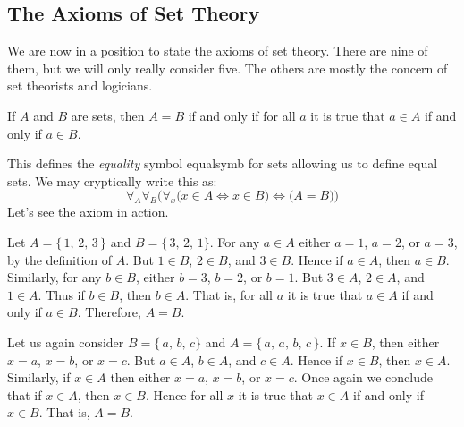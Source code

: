         \subsection{The Axioms of Set Theory}
            We are now in a position to state the axioms of set theory. There
            are nine of them, but we will only really consider five. The
            others are mostly the concern of set theorists and logicians.
            \begin{axiom}
                If $A$ and $B$ are sets, then $A=B$ if and only if for all
                $a$ it is true that $a\in{A}$ if and only if $a\in{B}$.%
            \end{axiom}
            This defines the \textit{equality} symbol \gls{equalsymb} for sets
            allowing us to define \glspl{equal set}.
            We may cryptically write this as:
            \begin{equation}
                \forall_{A}\forall_{B}\Big(
                    \forall_{x}\big(x\in{A}\Leftrightarrow{x}\in{B}\big)
                        \Leftrightarrow\big(A=B)\Big)
            \end{equation}
            Let's see the axiom in action.
            \begin{example}
                Let $A=\{\,1,\,2,\,3\,\}$ and $B=\{\,3,\,2,\,1\}$. For any
                $a\in{A}$ either $a=1$, $a=2$, or $a=3$, by the definition of
                $A$. But $1\in{B}$, $2\in{B}$, and $3\in{B}$. Hence if
                $a\in{A}$, then $a\in{B}$. Similarly, for any $b\in{B}$,
                either $b=3$, $b=2$, or $b=1$. But $3\in{A}$, $2\in{A}$,
                and $1\in{A}$. Thus if $b\in{B}$, then $b\in{A}$. That is, for
                all $a$ it is true that $a\in{A}$ if and only if $a\in{B}$.
                Therefore, $A=B$.
            \end{example}
            \begin{example}
                Let us again consider $B=\{\,a,\,b,\,c\}$ and
                $A=\{\,a,\,a,\,b,\,c\,\}$. If $x\in{B}$, then either
                $x=a$, $x=b$, or $x=c$. But $a\in{A}$, $b\in{A}$, and $c\in{A}$.
                Hence if $x\in{B}$, then $x\in{A}$. Similarly, if $x\in{A}$ then
                either $x=a$, $x=b$, or $x=c$. Once again we conclude that if
                $x\in{A}$, then $x\in{B}$. Hence for all $x$ it is true that
                $x\in{A}$ if and only if $x\in{B}$. That is, $A=B$.
            \end{example}
